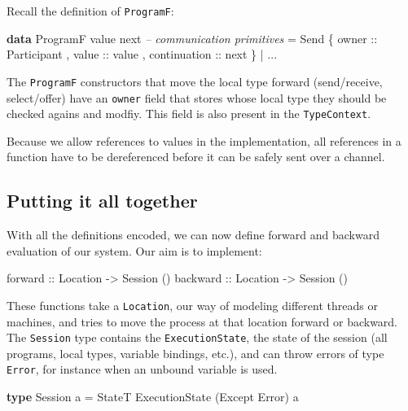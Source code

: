 \documentclass[runningheads,plain]{llncs}
\newenvironment{Shaded}{}{}
\newcommand{\KeywordTok}[1]{\textcolor[rgb]{0.00,0.44,0.13}{\textbf{#1}}}
\newcommand{\DataTypeTok}[1]{\textcolor[rgb]{0.56,0.13,0.00}{#1}}
\newcommand{\CommentTok}[1]{\textcolor[rgb]{0.38,0.63,0.69}{\textit{#1}}}
\newcommand{\OtherTok}[1]{\textcolor[rgb]{0.00,0.44,0.13}{#1}}
\newcommand{\FunctionTok}[1]{\textcolor[rgb]{0.02,0.16,0.49}{#1}}
\newcommand{\NormalTok}[1]{#1}
\begin{document}
Recall the definition of \texttt{ProgramF}:

\begin{Shaded}
\begin{Highlighting}[]
\KeywordTok{data} \DataTypeTok{ProgramF}\NormalTok{ value next }
    \CommentTok{-- communication primitives}
    \FunctionTok{=} \DataTypeTok{Send} 
\NormalTok{        \{}\OtherTok{ owner ::} \DataTypeTok{Participant}
\NormalTok{        ,}\OtherTok{ value ::}\NormalTok{ value}
\NormalTok{        ,}\OtherTok{ continuation ::}\NormalTok{ next }
\NormalTok{        \}}
    \FunctionTok{|} \FunctionTok{...} 
\end{Highlighting}
\end{Shaded}

The \texttt{ProgramF} constructors that move the local type forward
(send/receive, select/offer) have an \texttt{owner} field that stores
whose local type they should be checked agains and modfiy. This field is
also present in the \texttt{TypeContext}.

Because we allow references to values in the implementation, all
references in a function have to be dereferenced before it can be safely
sent over a channel.


\subsection{Putting it all together}\label{combining}

With all the definitions encoded, we can now define forward and backward
evaluation of our system. Our aim is to implement:

\begin{Shaded}
\begin{Highlighting}[]
\OtherTok{forward  ::} \DataTypeTok{Location} \OtherTok{->} \DataTypeTok{Session}\NormalTok{ ()}
\OtherTok{backward ::} \DataTypeTok{Location} \OtherTok{->} \DataTypeTok{Session}\NormalTok{ ()}
\end{Highlighting}
\end{Shaded}

These functions take a \texttt{Location}, our way of modeling different
threads or machines, and tries to move the process at that location
forward or backward. The \texttt{Session} type contains the
\texttt{ExecutionState}, the state of the session (all programs, local
types, variable bindings, etc.), and can throw errors of type
\texttt{Error}, for instance when an unbound variable is used.

\begin{Shaded}
\begin{Highlighting}[]
\KeywordTok{type} \DataTypeTok{Session}\NormalTok{ a }\FunctionTok{=} \DataTypeTok{StateT} \DataTypeTok{ExecutionState}\NormalTok{ (}\DataTypeTok{Except} \DataTypeTok{Error}\NormalTok{) a}
\end{Highlighting}
\end{Shaded}
\end{document}
